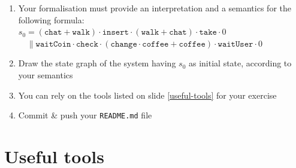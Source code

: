 \documentclass[handout]{beamer}\mode<presentation>{\usetheme{AMSCesenaBleu}}
\begin{document}
\begin{frame}[allowframebreaks]
\begin{enumerate}
        \item Your formalisation must provide an interpretation and a semantics for the following formula:
        \\\vspace{.1cm}
        \alert{$
            s_0 = (\mathtt{chat} + \mathtt{walk}) \cdot \mathtt{insert} \cdot (\mathtt{walk} + \mathtt{chat}) \cdot \mathtt{take} \cdot 0
        $\\\hfill$    
            \quad\parallel
            \mathtt{waitCoin} \cdot \mathtt{check} \cdot (\mathtt{change} \cdot \mathtt{coffee} + \mathtt{coffee}) \cdot \mathtt{waitUser} \cdot 0
        $}
        
        \item Draw the state graph of the system having $s_0$ as initial state, according to your semantics
        
        \item You can rely on the tools listed on slide \ref{useful-tools} for your exercise
        
        \item Commit \& push your \texttt{README.md} file
        
    \end{enumerate}
    

\end{frame}

\section{Useful tools}
\end{document}
